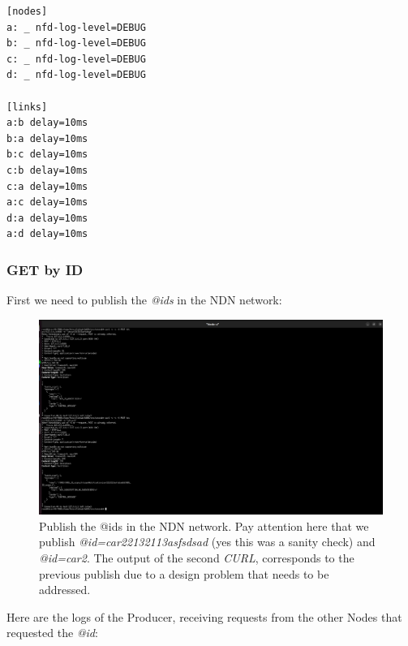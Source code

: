 \documentclass{article}
\begin{document}
\begin{lstlisting}[language=minindnconf,caption={Mini-NDN topology .conf file},label={lst:minindn_conf}]
[nodes]
a: _ nfd-log-level=DEBUG
b: _ nfd-log-level=DEBUG
c: _ nfd-log-level=DEBUG
d: _ nfd-log-level=DEBUG

[links]
a:b delay=10ms
b:a delay=10ms
b:c delay=10ms
c:b delay=10ms
c:a delay=10ms
a:c delay=10ms
d:a delay=10ms
a:d delay=10ms
\end{lstlisting}


\pagebreak 

\subsubsection{GET by ID}

First we need to publish the \textit{@ids} in the NDN network: 

\begin{figure}[H]
    \centering
    \includegraphics[width=1\linewidth]{images/publish_id_minindn.png}
    \caption{Publish the @ids in the NDN network. Pay attention here that we publish \textit{@id=car22132113asfsdsad} (yes this was a sanity check) and \textit{@id=car2}. The output of the second \emph{CURL}, corresponds to the previous publish due to a design problem that needs to be addressed.}
    \label{fig:publish_ids_minindn}
\end{figure}


Here are the logs of the Producer, receiving requests from the other Nodes that requested the \textit{@id}: 
\end{document}
